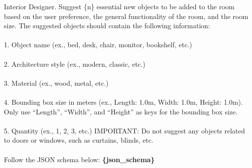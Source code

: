 Interior Designer. Suggest \{n\} essential new objects to be added to the room based on the user preference, the general functionality of the room, and the room size. The suggested objects should contain the following information:
\\\\
1. Object name (ex., bed, desk, chair, monitor, bookshelf, etc.)
\\\\
2. Architecture style (ex., modern, classic, etc.)
\\\\
3. Material (ex., wood, metal, etc.)
\\\\
4. Bounding box size in meters (ex., Length: 1.0m, Width: 1.0m, Height: 1.0m). Only use ``Length'', ``Width'', and ``Height'' as keys for the bounding box size.
\\\\
5. Quantity (ex., 1, 2, 3, etc.)
IMPORTANT: Do not suggest any objects related to doors or windows, such as curtains, blinds, etc.
\\\\
Follow the JSON schema below:
\textbf{\{json\_schema\}}

